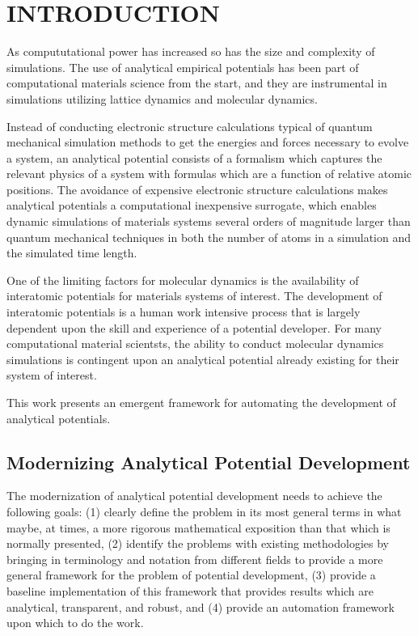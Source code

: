 \chapter{INTRODUCTION}\label{intro}

As compututational power has increased so has the size and complexity of simulations.  The use of analytical empirical potentials has been part of computational materials science from the start, and they are instrumental in simulations utilizing lattice dynamics and molecular dynamics.

Instead of conducting electronic structure calculations typical of quantum mechanical simulation methods to get the energies and forces necessary to evolve a system, an analytical potential consists of a formalism which captures the relevant physics of a system with formulas which are a function of relative atomic positions.  The avoidance of expensive electronic structure calculations makes analytical potentials a computational inexpensive surrogate, which enables dynamic simulations of materials systems several orders of magnitude larger than quantum mechanical techniques in both the number of atoms in a simulation and the simulated time length.

One of the limiting factors for molecular dynamics is the availability of interatomic potentials for materials systems of interest.  The development of interatomic potentials is a human work intensive process that is largely dependent upon the skill and experience of a potential developer.  For many computational material scientsts, the ability to conduct molecular dynamics simulations is contingent upon an analytical potential already existing for their system of interest.

This work presents an emergent framework for automating the development of analytical potentials.

\section{Modernizing Analytical Potential Development}

The modernization of analytical potential development needs to achieve the following goals:
(1) clearly define the problem in its most general terms in what maybe, at times, a more rigorous mathematical exposition than that which is normally presented,
(2) identify the problems with existing methodologies by bringing in terminology and notation from different fields to provide a more general framework for the problem of potential development,
(3) provide a baseline implementation of this framework that provides results which are analytical, transparent, and robust, and
(4) provide an automation framework upon which to do the work.

